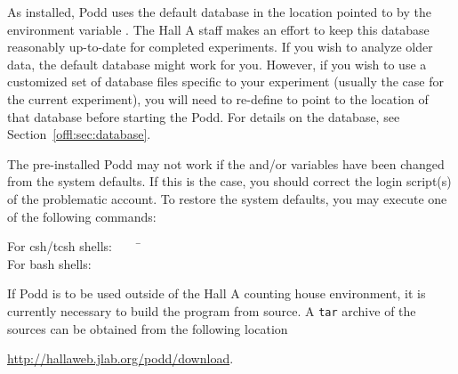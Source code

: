{{As installed, Podd uses the default database in
the location pointed to by the environment variable .
The Hall A staff makes an effort to keep this database reasonably 
up-to-date for completed experiments. If you wish to analyze older data,
the default database might work for you. However, 
if you wish to use a customized set of database files
specific to your experiment (usually the case for the current experiment), 
you will need to re-define  to
point to the location of that database before starting the Podd.
For details on the database, see Section~\ref{offl:sec:database}.

The pre-installed Podd may not work if 
the  and/or  variables have been
changed from the system defaults. If this is the case, you should
correct the login script(s) of the problematic account.
To restore the system defaults, you may execute one of the following 
commands:

\begin{tabbing}
For csh/tcsh shells:$\qquad$ \= \\
For bash shells:     \> 
\end{tabbing}

If Podd is to be used outside of the Hall A counting house
environment, it is currently necessary to build the program from source.
A {\tt tar} archive of the sources can be obtained from the following
location
\begin{center}
  \url{http://hallaweb.jlab.org/podd/download}.
\end{center}

}}
